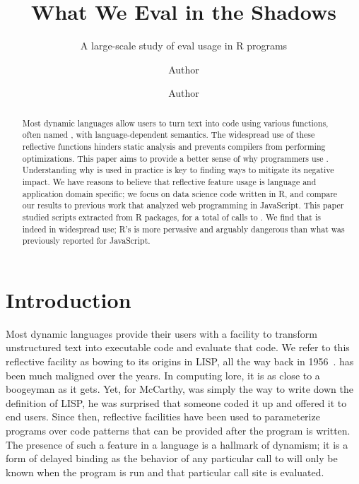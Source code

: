 \documentclass[review,screen,acmsmall,anonymous=true]{acmart}
\begin{document}
\title{What We Eval in the Shadows}
\subtitle{A large-scale study of {\sf eval} usage in R programs}

\author{Author }
\orcid{}\author{Author}\authornotemark[1]

\begin{abstract}
  \noindent Most dynamic languages allow users to turn text into code using
  various functions, often named \eval, with language-dependent semantics. The
  widespread use of these reflective functions hinders static analysis and
  prevents compilers from performing optimizations. This paper aims to provide a
  better sense of why programmers use \eval. Understanding why \eval is used in
  practice is key to finding ways to mitigate its negative impact. We have
  reasons to believe that reflective feature usage is language and application
  domain specific; we focus on data science code written in R, and compare our
  results to previous work that analyzed web programming in JavaScript. This
  paper studied \CranRunnableScripts scripts extracted from \CranPackages R
  packages, for a total of \packageAllcalls calls to \eval. We find that \eval
  is indeed in widespread use; R's \eval is more pervasive and arguably
  dangerous than what was previously reported for JavaScript.
\end{abstract}

\maketitle

\section{Introduction}

Most dynamic languages provide their users with a facility to
transform unstructured text into executable code and evaluate that
code. We refer to this reflective facility as \eval bowing to its
origins in LISP, all the way back in 1956~\cite{lisp}. \Eval has been
much maligned over the years. In computing lore, it is as close to a
boogeyman as it gets. Yet, for McCarthy, \eval was simply the way to
write down the definition of LISP, he was surprised that someone coded
it up and offered it to end users. Since then, reflective facilities
have been used to parameterize programs over code patterns that can be
provided after the program is written. The presence of such a feature
in a language is a hallmark of dynamism; it is a form of delayed
binding as the behavior of any particular call to \eval will only be
known when the program is run and that particular call site is
evaluated.
\end{document}
